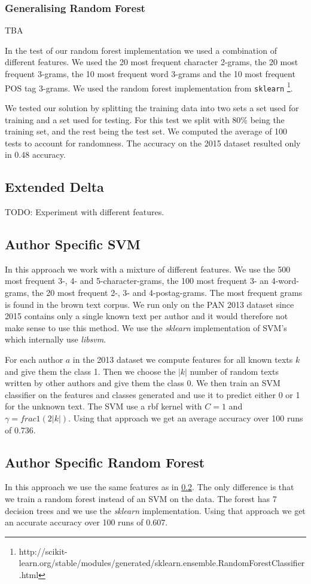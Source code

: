 \subsubsection{Generalising Random Forest}
TBA


In the test of our random forest implementation we used a combination
of different features. We used the 20 most frequent character
2-grams, the 20 most frequent 3-grams, the 10 most frequent
word 3-grams and the 10 most frequent \gls{POS} tag 3-grams.
We used the random forest implementation from \texttt{sklearn}
\footnote{http://scikit-learn.org/stable/modules/generated/sklearn.ensemble.RandomForestClassifier.html}.

We tested our solution by splitting the training data into two sets a set used
for training and a set used for testing. For this test we split with 80\% being
the training set, and the rest being the test set. We computed the average of
100 tests to account for randomness. The accuracy on the 2015 dataset resulted
only in 0.48 accuracy.

\subsection{Extended Delta}
TODO: Experiment with different features.

\subsection{Author Specific SVM} \label{subsec:author_specific_svm}
In this approach we work with a mixture of different features. We use the 500
most frequent 3-, 4- and 5-character-grams, the 100 most frequent 3- an
4-word-grams, the 20 most frequent 2-, 3- and 4-postag-grams. The most frequent
grams is found in the brown text corpus. We run only on the PAN 2013 dataset
since 2015 contains only a single known text per author and it would therefore
not make sense to use this method. We use the \textit{sklearn} implementation of
\gls{SVM}'s which internally use \textit{libsvm}.

For each author $a$ in the 2013 dataset we compute features for all known texts
$k$ and give them the class 1. Then we choose the $|k|$ number of random texts
written by other authors and give them the class 0. We then train an \gls{SVM}
classifier on the features and classes generated and use it to predict either 0
or 1 for the unknown text. The \gls{SVM} use a rbf kernel with $C=1$ and
$\gamma = frac{1}{(2|k|)}$. Using that approach we get an average accuracy over
100 runs of 0.736.

\subsection{Author Specific Random Forest}
In this approach we use the same features as in
\ref{subsec:author_specific_svm}. The only difference is that we train a random
forest instead of an \gls{SVM} on the data. The forest has 7 decision trees and
we use the \textit{sklearn} implementation. Using that approach we get an
accurate accuracy over 100 runs of 0.607.
